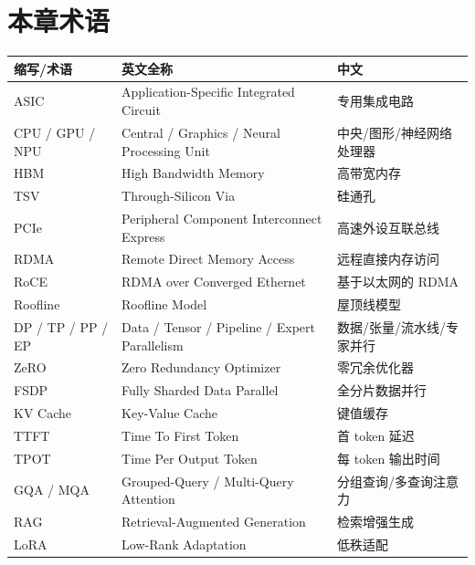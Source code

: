 \documentclass{article}
\begin{document}
\section*{本章术语}



{\begin{longtable}{lll}
\toprule
缩写/术语 & 英文全称 & 中文 \\
\midrule
\endhead
ASIC & Application-Specific Integrated Circuit & 专用集成电路 \\
CPU / GPU / NPU & Central / Graphics / Neural Processing Unit & 中央/图形/神经网络处理器 \\
HBM & High Bandwidth Memory & 高带宽内存 \\
TSV & Through-Silicon Via & 硅通孔 \\
PCIe & Peripheral Component Interconnect Express & 高速外设互联总线 \\
RDMA & Remote Direct Memory Access & 远程直接内存访问 \\
RoCE & RDMA over Converged Ethernet & 基于以太网的 RDMA \\
Roofline & Roofline Model & 屋顶线模型 \\
DP / TP / PP / EP & Data / Tensor / Pipeline / Expert Parallelism & 数据/张量/流水线/专家并行 \\
ZeRO & Zero Redundancy Optimizer & 零冗余优化器 \\
FSDP & Fully Sharded Data Parallel & 全分片数据并行 \\
KV Cache & Key-Value Cache & 键值缓存 \\
TTFT & Time To First Token & 首 token 延迟 \\
TPOT & Time Per Output Token & 每 token 输出时间 \\
GQA / MQA & Grouped-Query / Multi-Query Attention & 分组查询/多查询注意力 \\
RAG & Retrieval-Augmented Generation & 检索增强生成 \\
LoRA & Low-Rank Adaptation & 低秩适配 \\
\bottomrule
\end{longtable}
}
\end{document}
